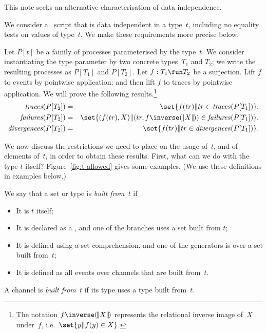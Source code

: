 
This note seeks an alternative characterisation of data independence.

We consider a \CSPm\ script that is data independent in a type~$t$, including
no equality tests on values of type~$t$.  We make these requirements more
precise below.

Let $P[t]$ be a family of processes parameterised by the type~$t$.  We
consider instantiating the type parameter by two concrete types~$T_1$ and
$T_2$; we write the resulting processes as $P[T_1]$ and $P[T_2]$.  Let $f: T_1
\fun T_2$ be a surjection.  Lift $f$ to events by pointwise application; and
then lift $f$ to traces by pointwise application.  We will prove the following
results.\footnote{The notation $f\inverse \banana{X}$ represents the
  relational inverse image of~$X$ under~$f$, i.e.~$\set{y \| f(y) \in X}$.}
%
\begin{eqnarray}
\traces(P[T_2]) & = & \set{f(tr) \| tr \in \traces(P[T_1])},
  \label{eqn:traces} \\
\failures(P[T_2]) & = &
  \set{(f(tr), X) \| (tr, f\inverse \banana{X}) \in \failures(P[T_1])},
  \label{eqn:failures} \\
\divergences(P[T_2]) & = & \set{f(tr) \| tr \in \divergences(P[T_1])}.
\end{eqnarray}


We now discuss the restrictions we need to place on the usage of~$t$, and of
elements of~$t$, in order to obtain these results.  First, what can we do with
the type $t$ itself?  Figure~\ref{fig:t-allowed} gives some examples.  (We use
these definitions in examples below.)
\framebox{\ldots} 

\begin{definition}
We say that a set or type is \emph{built from~$t$} if
%
\begin{itemize}
\item It is $t$ itself;

\item It is declared as a , and one of the branches uses a set
  built from $t$;

\item It is defined using a set comprehension, and one of the generators is
  over a set built from~$t$;

\item It is defined as all events over channels that are built from~$t$.
\end{itemize}
%
A channel is \emph{built from~$t$} if its type uses a type built from~$t$.
\end{definition}
 
